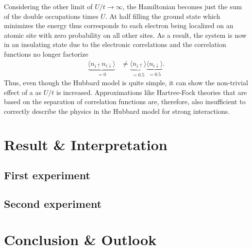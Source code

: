 \documentclass[a4paper,openright,twoside,12pt]{book}
\numberwithin{equation}{section}
\begin{document}
%
Considering the other limit of $U/t\rightarrow \infty$, the Hamiltonian becomes just the sum of the double occupations
times $U$. At half filling the ground state which minimizes the energy thus corresponds to each electron being localized
on an atomic site with zero probability on all other sites. As a result, the system is now in an insulating state
due to the electronic correlations and the correlation functions no longer factorize
\begin{align}
\underbrace{\langle n_{i\uparrow} n_{i\downarrow} \rangle}_{=0} 
&\neq \underbrace{\langle n_{i\uparrow} \rangle}_{=0.5} \underbrace{\langle n_{i\downarrow} \rangle}_{=0.5}.
\end{align}
Thus, even though the Hubbard model is quite simple, it can show the non-trivial effect of a {\mit}
as $U/t$ is increased. Approximations like Hartree-Fock theories that are based on the separation of correlation
functions are, therefore, also insufficient to correctly describe the physics in the Hubbard model for strong
interactions. 

\chapter{Result \& Interpretation}
\section{First experiment}

\section{Second experiment}

\chapter{Conclusion \& Outlook}


%
%

\renewcommand\bibname{References}


\end{document}
